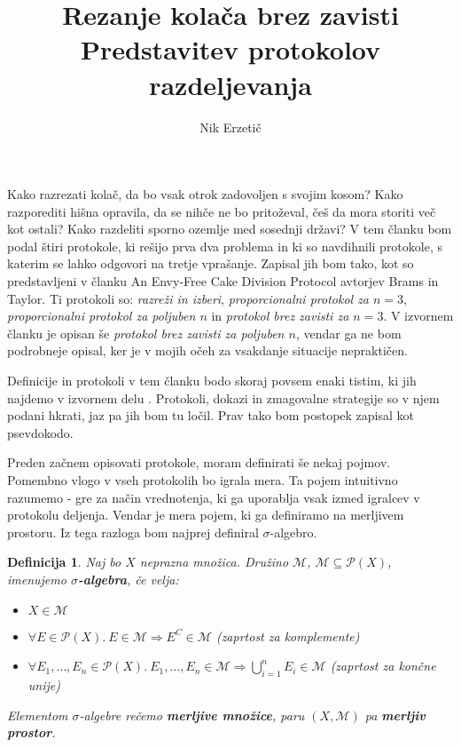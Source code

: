 \documentclass[a4paper, 12pt]{article}
\title{
	\textbf{Rezanje kolača brez zavisti} \\
	\large Predstavitev protokolov razdeljevanja 
}
\author{Nik Erzetič}
\newtheorem{definicija}{Definicija}
\begin{document}
	
	\maketitle
	
	Kako razrezati kolač, da bo vsak otrok zadovoljen s svojim kosom? Kako razporediti hišna opravila, da se nihče ne bo pritoževal, češ da mora storiti več kot ostali? Kako razdeliti sporno ozemlje med sosednji državi? V tem članku bom podal štiri protokole, ki rešijo prva dva problema in ki so navdihnili protokole, s katerim se lahko odgovori na tretje vprašanje. Zapisal jih bom tako, kot so predstavljeni v članku An Envy-Free Cake Division Protocol \cite{brams-taylor} avtorjev Brams in Taylor. Ti protokoli so: \textit{razreži in izberi}, \textit{proporcionalni protokol za $n = 3$}, \textit{proporcionalni protokol za poljuben $n$} in \textit{protokol brez zavisti za $n = 3$}. V izvornem članku je opisan še \textit{protokol brez zavisti za poljuben $n$}, vendar ga ne bom podrobneje opisal, ker je v mojih očeh za vsakdanje situacije nepraktičen.
	
	Definicije in protokoli v tem članku bodo skoraj povsem enaki tistim, ki jih najdemo v izvornem delu \cite{brams-taylor}. Protokoli, dokazi in zmagovalne strategije so v njem podani hkrati, jaz pa jih bom tu ločil. Prav tako bom postopek zapisal kot psevdokodo.
	
	Preden začnem opisovati protokole, moram definirati še nekaj pojmov. Pomembno vlogo v vseh protokolih bo igrala mera. Ta pojem intuitivno razumemo - gre za način vrednotenja, ki ga uporablja vsak izmed igralcev v protokolu deljenja. Vendar je mera pojem, ki ga definiramo na merljivem prostoru. Iz tega razloga bom najprej definiral $\sigma$-algebro.
	
	\begin{definicija}
		Naj bo $X$ neprazna množica. Družino $\mathcal{M}$, $\mathcal{M} \subseteq \mathcal{P}(X)$, imenujemo \textbf{$\sigma$-algebra}, če velja:
		\begin{itemize}
			\item $X \in \mathcal{M}$
			
			\item $\forall E \in \mathcal{P}(X).\ E \in \mathcal{M} \Rightarrow E^C \in \mathcal{M}$ (zaprtost za komplemente)
			
			\item $\forall E_1, \ldots, E_n \in \mathcal{P}(X).\ E_1, \ldots, E_n \in \mathcal{M} \Rightarrow \bigcup_{i=1}^{n} E_i \in \mathcal{M}$ (zaprtost za končne unije)
		\end{itemize}
		Elementom $\sigma$-algebre rečemo \textbf{merljive množice}, paru $(X, \mathcal{M})$ pa \textbf{merljiv prostor}.
	\end{definicija}
\end{document}
